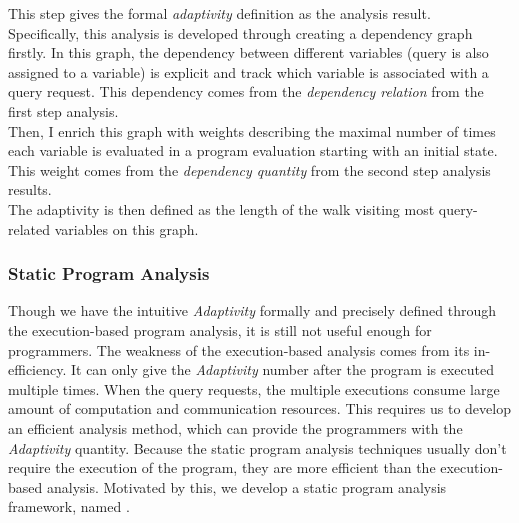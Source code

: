 \begin{enumerate}
   This step 
  gives the formal \emph{adaptivity} definition as the analysis result. 
  \\
  Specifically, this analysis is developed through creating a dependency graph firstly. 
  In this graph, the dependency between different variables (query is also assigned to a variable) 
  is explicit and track which variable is associated with a query request. 
  This dependency comes from the \emph{dependency relation} from the first step analysis.
  \\
 Then, I enrich this graph with 
 weights describing the maximal number of times each variable is evaluated in a program evaluation starting with an initial state. 
 This weight comes from the \emph{dependency quantity} from the second step analysis results.
 \\
  The adaptivity is then defined as the length of the walk visiting most query-related variables on this graph. 
      \end{enumerate}
\subsubsection{Static Program Analysis}
\label{sec:intro-static}
%
Though we have the intuitive \emph{Adaptivity} formally and precisely defined through the execution-based program analysis,
it is still not useful enough for programmers.
The weakness of the execution-based analysis comes from its in-efficiency.
It can only give the \emph{Adaptivity} number
after the program is executed multiple times.
When the query requests, the multiple executions consume large amount of computation and communication resources.
This requires us to develop an efficient analysis method, 
which can provide the programmers with the \emph{Adaptivity} quantity.
Because the static program analysis techniques usually don't require the execution of the program,
they are more efficient than the execution-based analysis.
Motivated by this, we develop a static program analysis framework, named {\THESYSTEM}.
